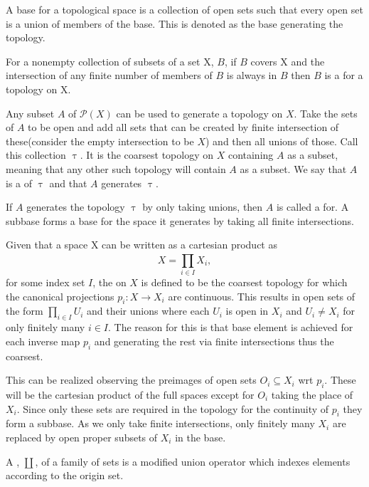\documentclass[../../main.tex]{subfiles}
\begin{document}
    A base for a topological space is a collection of open sets such that every open set is a union of members of the base. This is denoted as the base generating the topology.
    
    \begin{definition}
        For a nonempty collection of subsets of a set X, $B$, if $B$ covers X and the intersection of any finite number of members of $B$ is always in $B$ then $B$ is a  for a topology on X.
    \end{definition}
    
    Any subset $A$ of $\mathcal{P}(X)$ can be used to generate a topology on $X$. Take the sets of $A$ to be open and add all sets that can be created by finite intersection of these(consider the empty intersection to be $X$) and then all unions of those. Call this collection $\uptau$. It is the coarsest topology on $X$ containing $A$ as a subset, meaning that any other such topology will contain $A$ as a subset. We say that $A$ is a  of $\uptau$ and that $A$ generates $\uptau$. 
    
    If $A$ generates the topology $\uptau$ by only taking unions, then $A$ is called a  for. A subbase forms a base for the space it generates by taking all finite intersections.
    
    \begin{definition}
        Given that a space X can be written as a cartesian product as $$X=\prod_{i\in I}^{}X_i,$$ for some index set $I$, the  on $X$ is defined to be the coarsest topology for which the canonical projections $p_i:X\to X_i$ are continuous. This results in open sets of the form $ \prod_{i\in I}U_i$ and their unions where each $U_i$ is open in $X_i$ and $U_i \ne X_i$ for only finitely many $i\in I$. The reason for this is that  base element is achieved for each inverse map $p_i$ and generating the rest via finite intersections thus the coarsest.
    \end{definition}
    
    This can be realized observing the preimages of open sets $O_i \subseteq X_i$ wrt $p_i$. These will be the cartesian product of the full spaces except for $O_i$ taking the place of $X_i$. Since only these sets are required in the topology for the continuity of $p_i$ they form a subbase. As we only take finite intersections, only finitely many $X_i$ are replaced by open proper subsets of $X_i$ in the base.
    
    \begin{definition}
        A , $\coprod$, of a family of sets is a modified union operator which indexes elements according to the origin set. 
    \end{definition}
    
\end{document}
